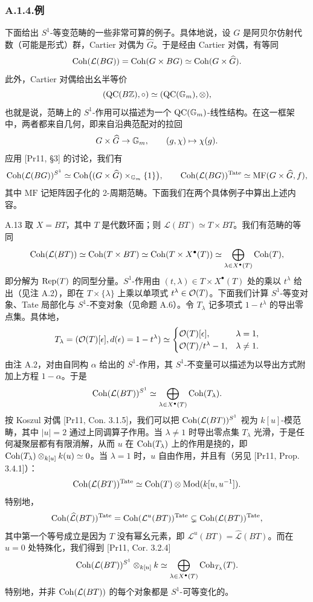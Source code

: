 \subsubsection*{A.1.4.\quad 例}

下面给出 $S^1$-等变范畴的一些非常可算的例子。具体地说，设 $G$ 是阿贝尔仿射代数（可能是形式）群，Cartier 对偶为 $\widehat{G}$。于是经由 Cartier 对偶，有等同
\[
\operatorname{Coh}(\mathcal L(BG))=\operatorname{Coh}(G\times BG)\simeq\operatorname{Coh}(G\times\widehat{G}).
\]
此外，Cartier 对偶给出幺半等价
\[
(\mathrm{QC}(B\mathbb{Z}),\circ)\simeq(\mathrm{QC}(\mathbb{G}_m),\otimes),
\]
也就是说，范畴上的 $S^1$-作用可以描述为一个 $\mathrm{QC}(\mathbb{G}_m)$-线性结构。在这一框架中，两者都来自几何，即来自沿典范配对的拉回
\[
G\times\widehat{G}\to\mathbb{G}_m,\qquad (g,\chi)\mapsto\chi(g).
\]
应用 [Pr11, §3] 的讨论，我们有
\[
\operatorname{Coh}(\mathcal L(BG))^{S^1}\simeq\operatorname{Coh}\bigl((G\times\widehat{G})\times_{\mathbb{G}_m}\{1\}\bigr),\qquad
\operatorname{Coh}(\mathcal L(BG))^{\mathrm{Tate}}\simeq\mathrm{MF}(G\times\widehat{G},f),
\]
其中 $\mathrm{MF}$ 记矩阵因子化的 2-周期范畴。下面我们在两个具体例子中算出上述内容。


\begin{exam}{A.13}\label{exam:a5-04-7}
取 $X=BT$，其中 $T$ 是代数环面；则 $\mathcal L(BT)\simeq T\times BT$。我们有范畴的等同
\[
\operatorname{Coh}(\mathcal L(BT))\simeq\operatorname{Coh}(T\times BT)\simeq\operatorname{Coh}(T\times X^\bullet(T))
\simeq\bigoplus_{\lambda\in X^\bullet(T)}\operatorname{Coh}(T),
\]
即分解为 $\operatorname{Rep}(T)$ 的同型分量。$S^1$-作用由 $(t,\lambda)\in T\times X^\bullet(T)$ 处的乘以 $t^\lambda$ 给出（见注 A.2），即在 $T\times\{\lambda\}$ 上乘以单项式 $t^\lambda\in\mathcal{O}(T)$。下面我们计算 $S^1$-等变对象、Tate 局部化与 $S^1$-不变对象（见命题 A.6）。令 $T_\lambda$ 记多项式 $1-t^\lambda$ 的导出零点集。具体地，
\[
T_\lambda=(\mathcal{O}(T)[\epsilon],d(\epsilon)=1-t^\lambda)\simeq
\begin{cases}
\mathcal{O}(T)[\epsilon], & \lambda=1,\\
\mathcal{O}(T)/t^\lambda-1, & \lambda\neq1.
\end{cases}
\]
由注 A.2，对由自同构 $\alpha$ 给出的 $S^1$-作用，其 $S^1$-不变量可以描述为以导出方式附加上方程 $1-\alpha$。于是
\[
\operatorname{Coh}(\mathcal L(BT))^{S^1}\simeq\bigoplus_{\lambda\in X^\bullet(T)}\operatorname{Coh}(T_\lambda).
\]
按 Koszul 对偶 [Pr11, Con. 3.1.5]，我们可以把 $\operatorname{Coh}(\mathcal L(BT))^{S^1}$ 视为 $k[u]$-模范畴，其中 $|u|=2$ 通过上同调算子作用。当 $\lambda\neq1$ 时导出零点集 $T_\lambda$ 光滑，于是任何凝聚层都有有限消解，从而 $u$ 在 $\operatorname{Coh}(T_\lambda)$ 上的作用是挠的，即 $\operatorname{Coh}(T_\lambda)\otimes_{k[u]}k(u)\simeq0$。当 $\lambda=1$ 时，$u$ 自由作用，并且有（另见 [Pr11, Prop. 3.4.1]）：
\[
\operatorname{Coh}(\mathcal L(BT))^{\mathrm{Tate}}\simeq\operatorname{Coh}(T)\otimes\operatorname{Mod}(k[u,u^{-1}]).
\]
特别地，
\[
\operatorname{Coh}(\widehat{\mathcal L}(BT))^{\mathrm{Tate}}
=\operatorname{Coh}(\mathcal L^u(BT))^{\mathrm{Tate}}
\subsetneq\operatorname{Coh}(\mathcal L(BT))^{\mathrm{Tate}},
\]
其中第一个等号成立是因为 $T$ 没有幂幺元素，即 $\mathcal L^u(BT)=\widehat{\mathcal L}(BT)$。而在 $u=0$ 处特殊化，我们得到 [Pr11, Cor. 3.2.4]
\[
\operatorname{Coh}(\mathcal L(BT))^{S^1}\otimes_{k[u]}k
\simeq\bigoplus_{\lambda\in X^\bullet(T)}\operatorname{Coh}_{T_\lambda}(T).
\]
特别地，并非 $\operatorname{Coh}(\mathcal L(BT))$ 的每个对象都是 $S^1$-可等变化的。
\end{exam}

